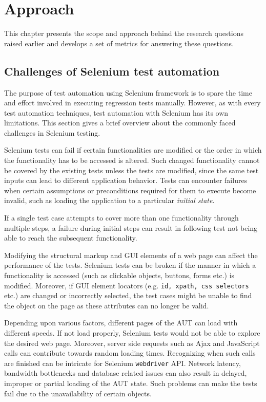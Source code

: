 \chapter{Approach} %

\label{Chapter3} %


This chapter presents the scope and approach behind the research questions raised earlier and develops a set of metrics for answering these questions.

\section{Challenges of Selenium test automation}
\label{challengesSelenium}
The purpose of test automation using Selenium framework is to spare the time and effort involved in executing regression tests manually. However, as with every test automation techniques, test automation with Selenium has its own limitations. This section gives a brief overview about the commonly faced challenges in Selenium testing.

Selenium tests can fail if certain functionalities are modified or the order in which the functionality has to be accessed is altered.
Such changed functionality cannot be covered by the existing tests unless the tests are modified, since the same test inputs can lead to different application behavior. Tests can encounter failures when certain assumptions or preconditions required for them to execute become invalid, such as loading the application to a particular \textit{initial state}.

If a single test case attempts to cover more than one functionality through multiple steps, a failure during initial steps can result in following test not being able to reach the subsequent functionality.

Modifying the structural markup and GUI elements of a web page can affect the performance of the tests. Selenium tests can be broken if the manner in which a functionality is accessed (such as clickable objects, buttons, forms etc.) is modified. Moreover, if GUI element locators (e.g. \texttt{id, xpath, css selectors} etc.) are changed or incorrectly selected, the test cases might be unable to find the object on the page as these attributes can no longer be valid.

Depending upon various factors, different pages of the AUT can load with different speeds. If not load properly, Selenium tests would not be able to explore the desired web page. Moreover, server side requests such as Ajax and JavaScript calls can contribute towards random loading times. Recognizing when such calls are finished can be intricate for Selenium \texttt{webdriver} API. Network latency, bandwidth bottlenecks and database related issues can also result in delayed, improper or partial loading of the AUT state. Such problems can make the tests fail due to the unavailability of certain objects.

